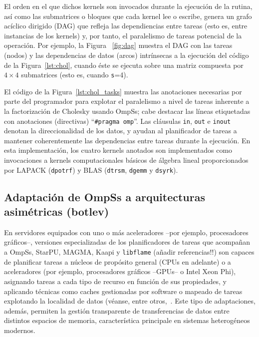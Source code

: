 El orden en el que dichos kernels son invocados durante la ejecución de la rutina, 
así como las submatrices o bloques que cada kernel lee o escribe, genera un grafo acíclico dirigido (DAG)
que refleja las dependiencias entre tareas (esto es, entre instancias de los kernels) y, por tanto,
el paralelismo de tareas potencial de la operación.
Por ejemplo, la Figura ~\ref{fig:dag} muestra el DAG con las tareas (nodos) y las dependencias de datos
(arcos) intrínsecas a la ejecución del código de la Figura~\ref{lst:chol}, cuando éste se ejecuta sobre
una matriz compuesta por $4 \times 4$ submatrices (esto es, cuando {\tt s}=4).  

El código de la Figura~\ref{lst:chol_tasks} muestra las anotaciones necesarias por parte del programador para explotar
el paralelismo a nivel de tareas inherente a la factorización de Cholesky usando OmpSs; cabe destacar las líneas etiquetadas
con  anotaciones (directivas) ``{\tt \#pragma omp}''.
Las cláusulas {\tt in}, {\tt out} e {\tt inout} denotan la direccionalidad de los datos, y ayudan al planificador
de tareas a mantener coherentemente las dependencias entre tareas durante la ejecución. 
En esta implementación, los cuatro kernels anotados son implementados como invocaciones a 
kernels computacionales básicos de álgebra lineal proporcionados por LAPACK
({\tt dpotrf}) y BLAS ({\tt dtrsm}, {\tt dgemm} y {\tt dsyrk}).



\subsection{Adaptación de OmpSs a arquitecturas asimétricas (botlev)}
\label{s3:botlev}

En servidores equipados con uno o más aceleradores --por ejemplo, procesadores gráficos--, versiones especializadas de los
planificadores de tareas que acompañan a OmpSs, StarPU, MAGMA, Kaapi y {\tt libflame} (añadir referencias!!) son capaces
de planificar tareas a núcleos de propósito general (CPUs en adelante) o a aceleradores (por ejemplo, procesadores gráficos
--GPUs-- o Intel Xeon Phi), asignando tareas a cada tipo de recurso en función de sus propiedades, y aplicando técnicas
como caches gestionadas por software o mapeado de tareas explotando la localidad de datos (véanse, entre 
otros,~\cite{Quintana:2008:PMA,CPE:CPE1463,Augonnet:2011:SUP:1951453.1951454,5470941,Gautier:2013:XRS:2510661.2511383}. Este
tipo de adaptaciones, además, permiten la gestión transparente de transferencias de datos entre distintos espacios de 
memoria, característica principale en sistemas heterogéneos modernos.

